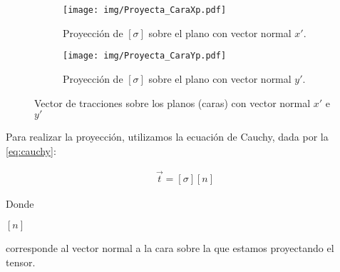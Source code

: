 \documentclass[12pt,letterpaper, twoside, openany]{article}
\begin{document}
\begin{figure}[H]
	\centering
	\begin{subfigure}[l]{0.45\textwidth}
		\texttt{[image: img/Proyecta\_CaraXp.pdf]}
		\caption{\small{Proyección de $\left[ \sigma \right]$ sobre el plano con vector normal $x'$.}}
		\label{fig:proycaraxp}
	\end{subfigure}
	\hspace{0.5 cm}
	\begin{subfigure}[r]{0.45\textwidth}
		\texttt{[image: img/Proyecta\_CaraYp.pdf]}
		\caption{\small{Proyección de $\left[ \sigma \right]$ sobre el plano con vector normal $y'$.}}
		\label{fig:proycarayp}
	\end{subfigure}
	\hspace{.5 cm}
	\caption{Vector de tracciones sobre los planos (caras) con vector normal $x'$ e $y'$ }
	\label{fig:proycara}
\end{figure}

Para realizar la proyección, utilizamos la ecuación de Cauchy, dada por la \cref{eq:cauchy}:
%
\begin{large}
	\begin{align}
		\overset{\rightarrow}{t}=\left[ \sigma \right] \left[n\right]
		\label{eq:cauchy}
	\end{align}
\end{large}
%
Donde \begin{large} $\left[ n \right]$\end{large} corresponde al vector normal a la cara sobre la que estamos proyectando el tensor. \\
\end{document}
